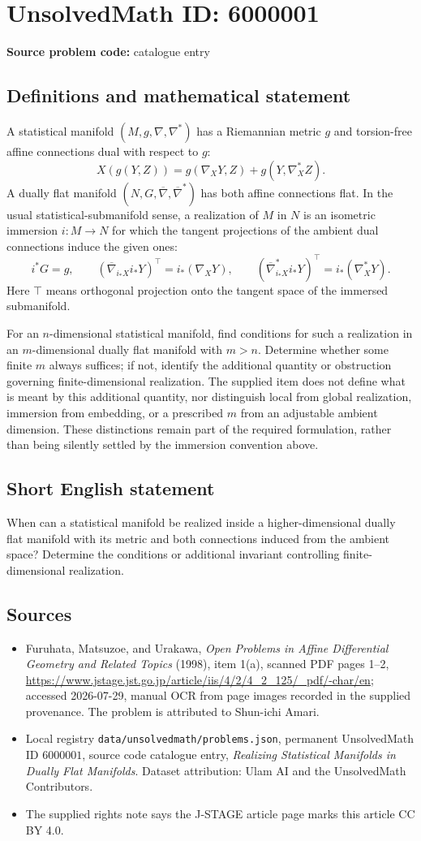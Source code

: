 \documentclass[11pt]{article}
\begin{document}
\section*{UnsolvedMath ID: 6000001}
\textbf{Source problem code:} catalogue entry
\subsection{Definitions and mathematical statement}
A statistical manifold $(M,g,\nabla,\nabla^*)$ has a Riemannian metric $g$ and torsion-free affine connections dual with respect to $g$:
\[
X(g(Y,Z))=g(\nabla_XY,Z)+g(Y,\nabla_X^*Z).
\]
A dually flat manifold $(N,G,\overline\nabla,\overline\nabla^*)$ has both affine connections flat. In the usual statistical-submanifold sense, a realization of $M$ in $N$ is an isometric immersion $i:M\to N$ for which the tangent projections of the ambient dual connections induce the given ones:
\[
i^*G=g,\qquad
(\overline\nabla_{i_*X}i_*Y)^\top=i_*(\nabla_XY),\qquad
(\overline\nabla^*_{i_*X}i_*Y)^\top=i_*(\nabla_X^*Y).
\]
Here $\top$ means orthogonal projection onto the tangent space of the immersed submanifold.

For an $n$-dimensional statistical manifold, find conditions for such a realization in an $m$-dimensional dually flat manifold with $m>n$. Determine whether some finite $m$ always suffices; if not, identify the additional quantity or obstruction governing finite-dimensional realization. The supplied item does not define what is meant by this additional quantity, nor distinguish local from global realization, immersion from embedding, or a prescribed $m$ from an adjustable ambient dimension. These distinctions remain part of the required formulation, rather than being silently settled by the immersion convention above.
\subsection{Short English statement}
When can a statistical manifold be realized inside a higher-dimensional dually flat manifold with its metric and both connections induced from the ambient space? Determine the conditions or additional invariant controlling finite-dimensional realization.
\subsection{Sources}
\begin{itemize}
\item Furuhata, Matsuzoe, and Urakawa, \emph{Open Problems in Affine Differential Geometry and Related Topics} (1998), item 1(a), scanned PDF pages 1--2, \url{https://www.jstage.jst.go.jp/article/iis/4/2/4_2_125/_pdf/-char/en}; accessed 2026-07-29, manual OCR from page images recorded in the supplied provenance. The problem is attributed to Shun-ichi Amari.
\item Local registry \texttt{data/unsolvedmath/problems.json}, permanent UnsolvedMath ID $6000001$, source code catalogue entry, \emph{Realizing Statistical Manifolds in Dually Flat Manifolds}. Dataset attribution: Ulam AI and the UnsolvedMath Contributors.
\item The supplied rights note says the J-STAGE article page marks this article CC BY 4.0.
\end{itemize}
\end{document}
